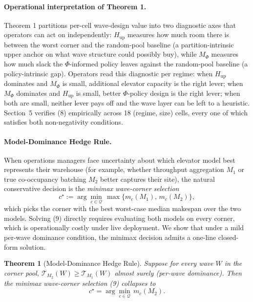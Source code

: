\documentclass[11pt, a4paper]{article}
\newtheorem{theorem}{Theorem}
\theoremstyle{definition}
\begin{document}
\paragraph{Operational interpretation of Theorem 1.} Theorem 1 partitions per-cell wave-design value into two diagnostic axes that operators can act on independently: $H_{\text{up}}$ measures how much room there is between the worst corner and the random-pool baseline (a partition-intrinsic upper anchor on what wave structure could possibly buy), while $M_\Phi$ measures how much slack the $\Phi$-informed policy leaves against the random-pool baseline (a policy-intrinsic gap). Operators read this diagnostic per regime: when $H_{\text{up}}$ dominates and $M_\Phi$ is small, additional elevator capacity is the right lever; when $M_\Phi$ dominates and $H_{\text{up}}$ is small, better $\Phi$-policy design is the right lever; when both are small, neither lever pays off and the wave layer can be left to a heuristic. Section~5 verifies (8) empirically across 18 (regime, size) cells, every one of which satisfies both non-negativity conditions.

\paragraph{Model-Dominance Hedge Rule.} When operations managers face uncertainty about which elevator model best represents their warehouse (for example, whether throughput aggregation $M_1$ or true co-occupancy batching $M_2$ better captures their site), the natural conservative decision is the \emph{minimax wave-corner selection}
\begin{equation}\label{eq:minimax}\tag{9}
c^\star := \arg\min_{c \in \mathcal{Q}} \, \max\{m_c(M_1), \, m_c(M_2)\},
\end{equation}
which picks the corner with the best worst-case median makespan over the two models. Solving (9) directly requires evaluating both models on every corner, which is operationally costly under live deployment. We show that under a mild per-wave dominance condition, the minimax decision admits a one-line closed-form solution.

\begin{theorem}[Model-Dominance Hedge Rule]\label{thm:hedge}
Suppose for every wave $W$ in the corner pool, $\mathcal{T}_{M_2}(W) \geq \mathcal{T}_{M_1}(W)$ almost surely (per-wave dominance). Then the minimax wave-corner selection (9) collapses to
\begin{equation}\label{eq:hedge}\tag{10}
c^\star = \arg\min_{c \in \mathcal{Q}} \, m_c(M_2).
\end{equation}
\end{theorem}
\end{document}
